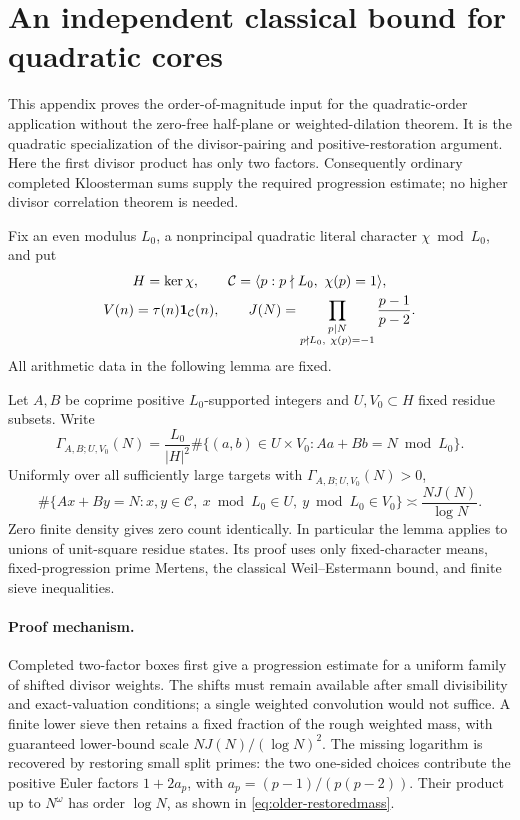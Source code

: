 \section{An independent classical bound for quadratic cores}\label{sec:older-route}

This appendix proves the order-of-magnitude input for the quadratic-order
application without the zero-free half-plane or weighted-dilation
theorem.  It is the quadratic specialization of the divisor-pairing
and positive-restoration argument.  Here the first divisor product has
only two factors.  Consequently ordinary completed Kloosterman sums
supply the required progression estimate; no higher divisor
correlation theorem is needed.

Fix an even modulus \(L_0\), a nonprincipal quadratic literal character
\(\chi\bmod L_0\), and put
\[
 \begin{gathered}
 H=\ker\chi,\qquad
 \mathcal C=\langle p:p\nmid L_0,\ \chi(p)=1\rangle,\\
 V(n)=\tau(n)\mathbf 1_{\mathcal C}(n),\qquad
 J(N)=\prod_{\substack{p\mid N\\p\nmid L_0,\ \chi(p)=-1}}
                          \frac{p-1}{p-2}.
 \end{gathered}
\]
All arithmetic data in the following lemma are fixed.

\begin{lemma}\label{lem:older-quadratic-filter}
Let \(A,B\) be coprime positive \(L_0\)-supported integers and
\(U,V_0\subset H\) fixed residue subsets.  Write
\[
 \Gamma_{A,B;U,V_0}(N)=\frac{L_0}{|H|^2}
   \#\{(a,b)\in U\times V_0:Aa+Bb=N\bmod L_0\}.
\]
Uniformly over all sufficiently large targets with \(\Gamma_{A,B;U,V_0}(N)>0\),
\[
 \#\{Ax+By=N:x,y\in\mathcal C,\
                  x\bmod L_0\in U,\ y\bmod L_0\in V_0\}
                   \asymp\frac{NJ(N)}{\log N}.
\]
Zero finite density gives zero count identically.  In particular the
lemma applies to unions of unit-square residue states.
Its proof uses only fixed-character means, fixed-progression prime
Mertens, the classical Weil--Estermann bound, and finite sieve inequalities.
\end{lemma}

\paragraph{Proof mechanism.}
Completed two-factor boxes first give a progression estimate for a
uniform family of shifted divisor weights. The shifts must remain
available after small divisibility and exact-valuation conditions;
a single weighted convolution would not suffice. A finite lower sieve
then retains a fixed fraction of the rough weighted mass, with
guaranteed lower-bound scale \(NJ(N)/(\log N)^2\). The missing logarithm is recovered by
restoring small split primes: the two one-sided choices contribute
the positive Euler factors \(1+2a_p\), with
\(a_p=(p-1)/(p(p-2))\). Their product up to \(N^\omega\) has order
\(\log N\), as shown in \eqref{eq:older-restoredmass}.

